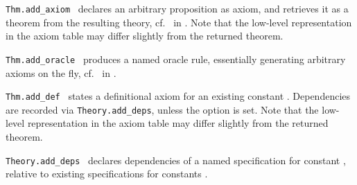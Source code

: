 \begin{isabellebody}
\begin{isamarkuptext}
\begin{description}
  \item \verb|Thm.add_axiom|~ declares an
  arbitrary proposition as axiom, and retrieves it as a theorem from
  the resulting theory, cf.\  in
  .  Note that the low-level representation in
  the axiom table may differ slightly from the returned theorem.

  \item \verb|Thm.add_oracle|~ produces a named
  oracle rule, essentially generating arbitrary axioms on the fly,
  cf.\  in .

  \item \verb|Thm.add_def|~ states a definitional axiom for an existing constant
  .  Dependencies are recorded via \verb|Theory.add_deps|,
  unless the  option is set.  Note that the
  low-level representation in the axiom table may differ slightly from
  the returned theorem.

  \item \verb|Theory.add_deps|~
  declares dependencies of a named specification for constant , relative to existing specifications for constants .


\end{description}
\end{isamarkuptext}
\end{isabellebody}
